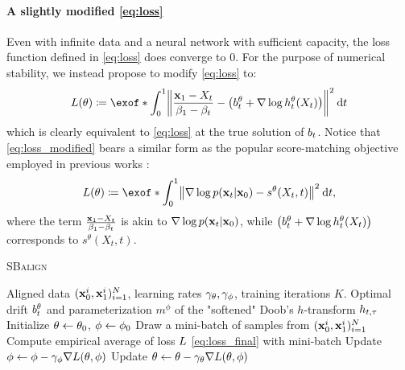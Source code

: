 \paragraph{A slightly modified \eqref{eq:loss}}
Even with infinite data and a neural network with sufficient capacity, the loss function defined in \eqref{eq:loss} does converge to 0. For the purpose of numerical stability, we instead propose to modify \eqref{eq:loss} to:
\begin{equation}
\label{eq:loss_modified}
\Loss(\theta) \defeq \exof*{\int_0^1 \norm*{\frac{\x_1-X_t}{\cvolat[\horizon]-\cvolat[\ctime]}- \left(\fdrift^\theta + \nabla \log \doob^\theta(X_t)\right)}^2 \dt  }
\end{equation}which is clearly equivalent to \eqref{eq:loss} at the true solution of $\fdrift$. Notice that \eqref{eq:loss_modified} bears a similar form as the popular score-matching objective employed in previous works \citep{song2019generative,song2020score}:
\begin{equation}
\label{eq:score_matching}
\Loss(\theta) \defeq \exof*{\int_0^1 \norm*{\nabla \log p(\x_t | \x_0)- s^\theta(X_t, t)}^2 \dt  },
\end{equation}
where the term $\frac{\x_1-X_t}{\cvolat[\horizon]-\cvolat[\ctime]}$ is akin to $\nabla \log p(\x_t | \x_0)$, while $\left(\fdrift^\theta + \nabla \log \doob^\theta(X_t)\right)$ corresponds to $s^\theta(X_t, t)$. 

 \begin{algorithm}[t]
   \caption{\textsc{SBalign}}
   \label{alg:SBalign}
\begin{algorithmic}
    Aligned data $(\x^i_0,\x^i_1)_{i=1}^N$, learning rates $\lrf,\lrb$, training iterations $K$. %
    Optimal drift $\fdrift^\theta$ and parameterization $m^{\phi}$ of the "softened" Doob's $h$-transform $\doobs$
\smallskip
   \STATE Initialize $\paramf \subs \paramf_0$, $\paramb \subs \paramb_0$
   \STATE Draw a mini-batch of samples from $(\x^i_0,\x^i_1)_{i=1}^N$
   \STATE Compute empirical average of loss $\Loss$ \eqref{eq:loss_final} with mini-batch
   \STATE Update $\paramb \subs \paramb - \lrb\nabla \Loss(\theta,\phi)$
   \STATE Update $\paramf \subs \paramf - \lrf\nabla \Loss(\theta,\phi)$
   \ENDFOR
\end{algorithmic}
\end{algorithm}

